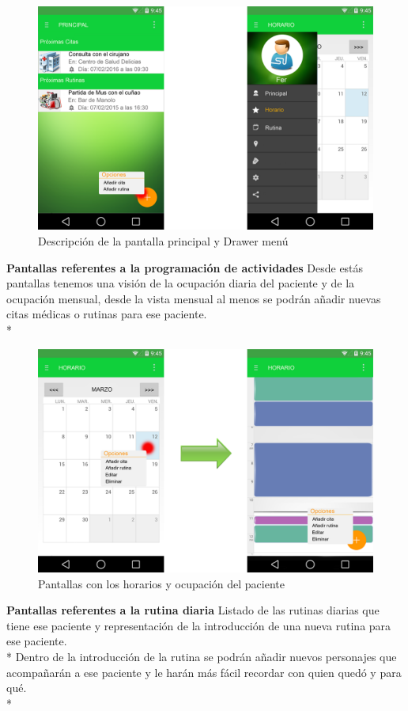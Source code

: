 \documentclass[../pfc.tex]{subfiles}
\begin{document}
			
			\begin{figure}[h]
				\centering
				\includegraphics[width=0.7\linewidth]{../images/principal_2}
				\caption[Drawer menú y Pantalla principal]{Descripción de la pantalla principal y Drawer menú}
				\label{fig:principal}
			\end{figure}
			
			
			\textbf{Pantallas referentes a la programación de actividades}
			Desde estás pantallas tenemos una visión de la ocupación diaria del paciente y de la ocupación mensual, desde la vista mensual al menos se podrán añadir nuevas citas médicas o rutinas para ese paciente.\\*

			
			\begin{figure}[h]
				\centering
				\includegraphics[width=0.7\linewidth]{../images/horario_2}
				\caption{Pantallas con los horarios y ocupación del paciente}
				\label{fig:horario_2}
			\end{figure}
			
			
			\textbf{Pantallas referentes a la rutina diaria}
			Listado de las rutinas diarias que tiene ese paciente y representación de la introducción de una nueva rutina para ese paciente.\\*
			Dentro de la introducción de la rutina se podrán añadir nuevos personajes que acompañarán a ese paciente y le harán más fácil recordar con quien quedó y para qué.\\*
\end{document}
